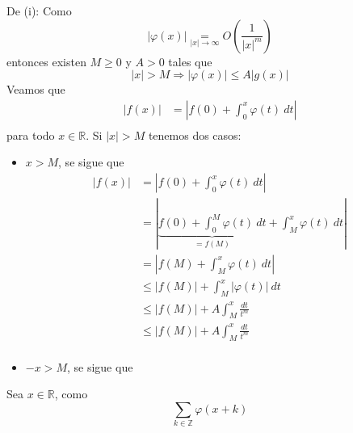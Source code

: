 \documentclass[12pt]{report}
\theoremstyle{largebreak}
\renewcommand{\leq}{\ensuremath{\leqslant}}
\renewcommand{\geq}{\ensuremath{\geqslant}}
\newcommand\abs[1]{\ensuremath{\left|#1\right|}}
\begin{document}
    \begin{sol}
        De (i): Como
        \begin{equation*}
            \abs{\varphi(x)}\underset{\abs{x}\rightarrow\infty}{=}O\left(\frac{1}{\abs{x}^m}\right)
        \end{equation*}
        entonces existen $M\geq0$ y $A>0$ tales que
        \begin{equation*}
            \abs{x}>M\Rightarrow \abs{\varphi(x)}\leq A\abs{g(x)}
        \end{equation*}
        Veamos que
        \begin{equation*}
            \begin{split}
                \abs{f(x)}&=\abs{f(0)+\int_0^x\varphi(t)\:dt}\\
            \end{split}
        \end{equation*}
        para todo $x\in\mathbb{R}$. Si $\abs{x}>M$ tenemos dos casos:
        \begin{itemize}
            \item $x>M$, se sigue que
            \begin{equation*}
                \begin{split}
                    \abs{f(x)}&=\abs{f(0)+\int_0^x\varphi(t)\:dt}\\
                    &=\abs{\underbrace{f(0)+\int_0^M\varphi(t)\:dt}_{=f(M)}+\int_M^x\varphi(t)\:dt}\\
                    &=\abs{f(M)+\int_M^x\varphi(t)\:dt}\\
                    &\leq\abs{f(M)}+\int_{M}^x\abs{\varphi(t)}\:dt\\
                    &\leq\abs{f(M)}+A\int_M^x\frac{dt}{t^{m}}\\
                    &\leq\abs{f(M)}+A\int_M^x\frac{dt}{t^{m}}\\
                \end{split}
            \end{equation*}
            \item $-x>M$, se sigue que 
        \end{itemize}
        Sea $x\in\mathbb{R}$, como 
        \begin{equation*}
            \sum_{ k\in\mathbb{Z}}\varphi(x+k)
        \end{equation*}
        
    \end{sol}
\end{document}
